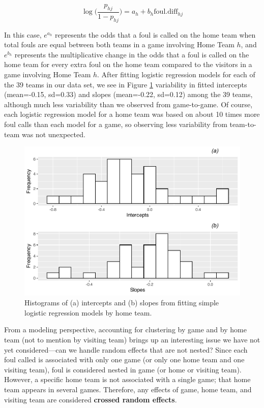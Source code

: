 \documentclass[
]{krantz}
\begin{document}
\begin{equation*}
\log\bigg(\frac{p_{hj}}{1-p_{hj}}\bigg)=a_h+b_h\mathrm{foul.diff}_{hj}
\end{equation*}

In this case, \(e^{a_{h}}\) represents the odds that a foul is called on the home team when total fouls are equal between both teams in a game involving Home Team \(h\), and \(e^{b_{h}}\) represents the multiplicative change in the odds that a foul is called on the home team for every extra foul on the home team compared to the visitors in a game involving Home Team \(h\). After fitting logistic regression models for each of the 39 teams in our data set, we see in Figure \ref{fig:gmu-histmat3} variability in fitted intercepts (mean=-0.15, sd=0.33) and slopes (mean=-0.22, sd=0.12) among the 39 teams, although much less variability than we observed from game-to-game. Of course, each logistic regression model for a home team was based on about 10 times more foul calls than each model for a game, so observing less variability from team-to-team was not unexpected.

\begin{figure}

{\centering \includegraphics[width=0.6\linewidth]{bookdown-BeyondMLR_files/figure-latex/gmu-histmat3-1} 

}

\caption{Histograms of (a) intercepts and (b) slopes from fitting simple logistic regression models by home team.}\label{fig:gmu-histmat3}
\end{figure}

From a modeling perspective, accounting for clustering by game and by home team (not to mention by visiting team) brings up an interesting issue we have not yet considered---can we handle random effects that are not nested? Since each foul called is associated with only one game (or only one home team and one visiting team), foul is considered nested in game (or home or visiting team). However, a specific home team is not associated with a single game; that home team appears in several games. Therefore, any effects of game, home team, and visiting team are considered \textbf{crossed random effects}. 
\end{document}
